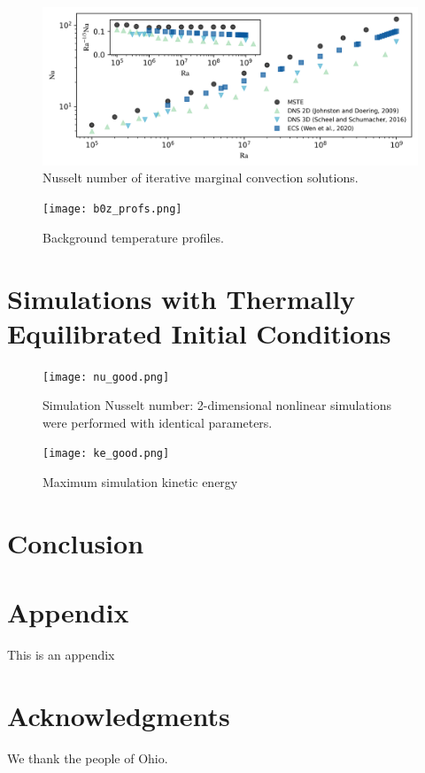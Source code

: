 \documentclass[twocolumn,showpacs,amsmath,amssymb]{revtex4}
\begin{document}
\begin{figure}[h]
    \centering
    \includegraphics[width=7.1in]{nu_ra.PNG}
    \caption{Nusselt number of iterative marginal convection solutions.}
    \label{fig:nu_vs_ra}
\end{figure}
\begin{figure}[h]
    \centering
    \texttt{[image: b0z\_profs.png]}
    \caption{Background temperature profiles.}
    \label{fig:my_label}
\end{figure}

 \newpage
\section{Simulations with Thermally Equilibrated Initial Conditions}

\begin{figure}[h]
    \centering
    \texttt{[image: nu\_good.png]}
    \caption{Simulation Nusselt number: 2-dimensional nonlinear simulations were performed with identical parameters.}
    \label{fig:my_label}
\end{figure}

\begin{figure}[h]
    \centering
    \texttt{[image: ke\_good.png]}
    \caption{Maximum simulation kinetic energy}
    \label{fig:my_label}
\end{figure}


\section{Conclusion}\label{sec:conclusion}

\section*{Appendix}
This is an appendix

\section*{Acknowledgments}
We thank the people of Ohio.


\end{document}
